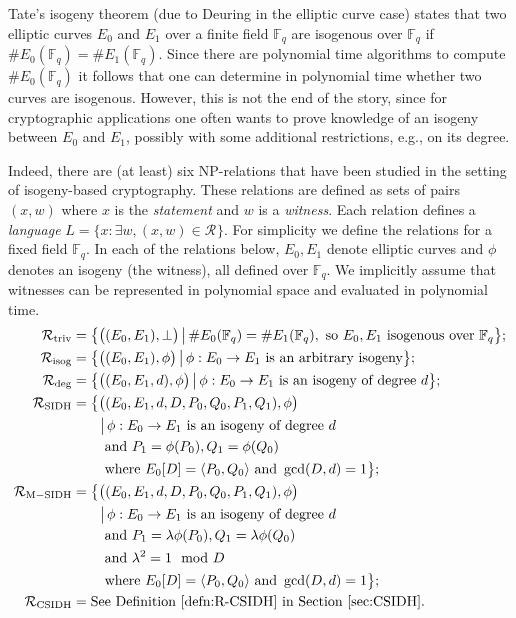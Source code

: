 \documentclass{llncs}
\newcommand{\F}{\ensuremath{\mathbb{F}}}
\newcommand{\R}[1][]{\ensuremath{\mathcal{R}_{\mathrm{#1}}}}
\begin{document}
Tate's isogeny theorem (due to Deuring in the elliptic curve case) states that two elliptic curves $E_0$ and $E_1$ over a finite field $\F_q$ are isogenous over $\F_q$ if $\#E_0( \F_q ) = \#E_1(\F_q)$. Since there are  polynomial time algorithms to compute $\#E_0( \F_q )$ it follows that one can determine in polynomial time whether two curves are isogenous. However, this is not the end of the story, since for cryptographic applications one often wants to prove knowledge of an isogeny between $E_0$ and $E_1$, possibly with some additional restrictions, e.g., on its degree.

Indeed, there are (at least) six NP-relations that have been studied in the setting of isogeny-based cryptography.
These relations are defined as sets of pairs $(x,w)$ where $x$ is the \emph{statement} and $w$ is a \emph{witness}.
Each relation defines a \emph{language} $L = \{ x : \exists w, (x,w) \in \R \}$.
For simplicity we define the relations for a fixed field $\F_q$.
In each of the relations below, $E_0,E_1$ denote elliptic curves and $\phi$ denotes an isogeny (the witness), all defined over $\F_q$.
We implicitly assume that witnesses can be represented in polynomial space and evaluated in polynomial time.
\begin{align*}
    \R[triv] &= \bigl\{ \bigl((E_0, E_1), \bot \bigr) \,\big\vert\, \#E_0( \F_q ) = \#E_1(\F_q), \text{ so } E_0, E_1 \text{ isogenous over } \F_q \bigr\};\\
    \R[isog]  &= \bigl\{ \bigl((E_0, E_1),\phi \bigr) \,\big\vert\, \phi : E_0 \to E_1 \text{ is an arbitrary isogeny}\bigr\};\\
    \R[deg]   &= \bigl\{ \bigl((E_0, E_1, d), \phi\bigr) \,\big\vert\, \phi : E_0 \to E_1 \text{ is an isogeny of degree } d \bigr\};\\
    \R[SIDH]  &= \bigl\{ \bigl((E_0, E_1, d, D, P_0, Q_0, P_1, Q_1 ),\phi \bigr) \\
              &\qquad \big\vert\, \phi : E_0 \to E_1 \text{ is an isogeny of degree } d \\
              &\qquad \text{ and } P_1 = \phi(P_0), Q_1 = \phi(Q_0) \\
              &\qquad \text{ where } E_0[D] = \langle P_0, Q_0\rangle  \text{ and } \gcd(D,d) = 1 \bigr\} ;\\
    \R[M-SIDH]&= \bigl\{ \bigl((E_0, E_1, d, D, P_0, Q_0, P_1, Q_1 ),\phi \bigr) \\
              &\qquad \big\vert\, \phi : E_0 \to E_1 \text{ is an isogeny of degree } d \\
              &\qquad \text{ and } P_1 = \lambda\phi(P_0), Q_1 = \lambda\phi(Q_0) \\
              &\qquad \text{ and } \lambda^2 = 1 \mod D \\
              &\qquad \text{ where } E_0[D] = \langle P_0, Q_0\rangle  \text{ and } \gcd(D,d) = 1 \bigr\} ;\\
    \R[CSIDH] &= \text{See Definition~\ref{defn:R-CSIDH} in Section~\ref{sec:CSIDH}.}
\end{align*}
\end{document}
